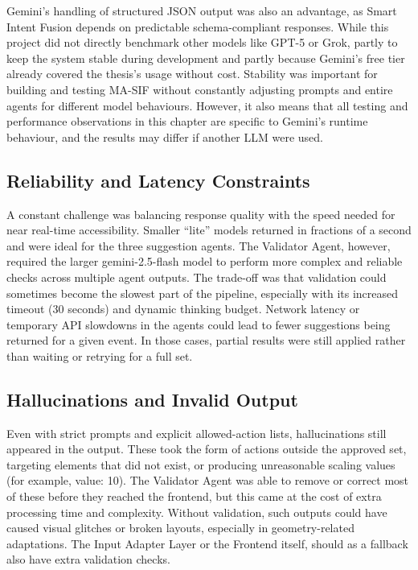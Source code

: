 \documentclass[openany]{book}
\begin{document}
Gemini’s handling of structured JSON output was also an advantage, as Smart Intent Fusion depends on predictable schema-compliant responses. While this project did not directly benchmark other models like GPT-5 or Grok, partly to keep the system stable during development and partly because Gemini’s free tier already covered the thesis’s usage without cost. Stability was important for building and testing MA-SIF without constantly adjusting prompts and entire agents for different model behaviours. However, it also means that all testing and performance observations in this chapter are specific to Gemini’s runtime behaviour, and the results may differ if another LLM were used.

\subsection{Reliability and Latency Constraints}
A constant challenge was balancing response quality with the speed needed for near real-time accessibility. Smaller “lite” models returned in fractions of a second and were ideal for the three suggestion agents. The Validator Agent, however, required the larger gemini-2.5-flash model to perform more complex and reliable checks across multiple agent outputs. The trade-off was that validation could sometimes become the slowest part of the pipeline, especially with its increased timeout (30 seconds) and dynamic thinking budget.
Network latency or temporary API slowdowns in the agents could lead to fewer suggestions being returned for a given event. In those cases, partial results were still applied rather than waiting or retrying for a full set.

\subsection{Hallucinations and Invalid Output}
Even with strict prompts and explicit allowed-action lists, hallucinations still appeared in the output. These took the form of actions outside the approved set, targeting elements that did not exist, or producing unreasonable scaling values (for example, value: 10). The Validator Agent was able to remove or correct most of these before they reached the frontend, but this came at the cost of extra processing time and complexity. Without validation, such outputs could have caused visual glitches or broken layouts, especially in geometry-related adaptations. The Input Adapter Layer or the Frontend itself, should as a fallback also have extra validation checks.
\end{document}
